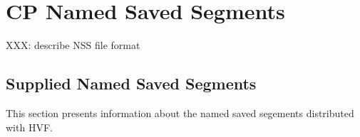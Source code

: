 \chapter{CP Named Saved Segments}
\label{chap:nss}
XXX: describe NSS file format

\section{Supplied Named Saved Segments}
This section presents information about the named saved segements
distributed with HVF.


